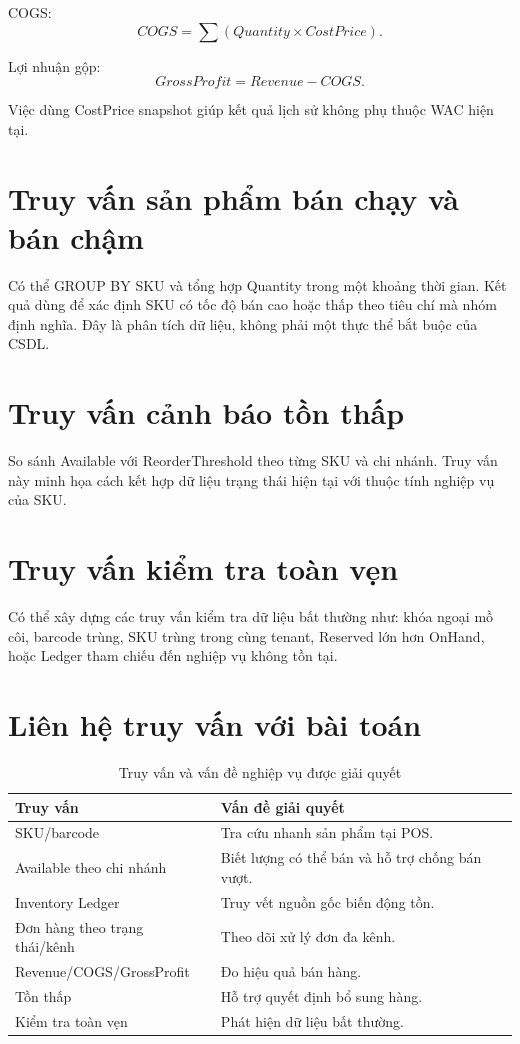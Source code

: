 COGS:
\[
COGS=\sum(Quantity\times CostPrice).
\]

Lợi nhuận gộp:
\[
GrossProfit=Revenue-COGS.
\]

Việc dùng CostPrice snapshot giúp kết quả lịch sử không phụ thuộc WAC hiện tại.

\section{Truy vấn sản phẩm bán chạy và bán chậm}

Có thể GROUP BY SKU và tổng hợp Quantity trong một khoảng thời gian. Kết quả dùng để xác định SKU có tốc độ bán cao hoặc thấp theo tiêu chí mà nhóm định nghĩa. Đây là phân tích dữ liệu, không phải một thực thể bắt buộc của CSDL.

\section{Truy vấn cảnh báo tồn thấp}

So sánh Available với ReorderThreshold theo từng SKU và chi nhánh. Truy vấn này minh họa cách kết hợp dữ liệu trạng thái hiện tại với thuộc tính nghiệp vụ của SKU.

\section{Truy vấn kiểm tra toàn vẹn}

Có thể xây dựng các truy vấn kiểm tra dữ liệu bất thường như: khóa ngoại mồ côi, barcode trùng, SKU trùng trong cùng tenant, Reserved lớn hơn OnHand, hoặc Ledger tham chiếu đến nghiệp vụ không tồn tại.

\section{Liên hệ truy vấn với bài toán}

\begin{table}[H]
\centering
\caption{Truy vấn và vấn đề nghiệp vụ được giải quyết}
\begin{tabular}{|p{}|p{}|}
\hline
\textbf{Truy vấn} & \textbf{Vấn đề giải quyết} \\
\hline
SKU/barcode & Tra cứu nhanh sản phẩm tại POS. \\
\hline
Available theo chi nhánh & Biết lượng có thể bán và hỗ trợ chống bán vượt. \\
\hline
Inventory Ledger & Truy vết nguồn gốc biến động tồn. \\
\hline
Đơn hàng theo trạng thái/kênh & Theo dõi xử lý đơn đa kênh. \\
\hline
Revenue/COGS/GrossProfit & Đo hiệu quả bán hàng. \\
\hline
Tồn thấp & Hỗ trợ quyết định bổ sung hàng. \\
\hline
Kiểm tra toàn vẹn & Phát hiện dữ liệu bất thường. \\
\hline
\end{tabular}
\end{table}
